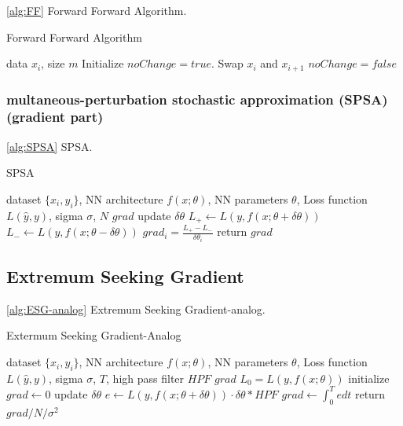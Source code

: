 \documentclass[nohyperref]{article}
\theoremstyle{plain}
\theoremstyle{definition}
\theoremstyle{remark}
\begin{document}
\cref{alg:FF} Forward Forward Algorithm.

\begin{algorithm}[tb]
   \caption{Forward Forward Algorithm}
   \label{alg:FF}
\begin{algorithmic}
    data $x_i$, size $m$
   \REPEAT
   \STATE Initialize $noChange = true$.
   \STATE Swap $x_i$ and $x_{i+1}$
   \STATE $noChange = false$
   \ENDIF
   \ENDFOR
\end{algorithmic}
\end{algorithm}

\subsubsection{multaneous-perturbation stochastic
approximation (SPSA) (gradient part)}

\cref{alg:SPSA} SPSA.

\begin{algorithm}[tb]
   \caption{SPSA}
   \label{alg:SPSA}
\begin{algorithmic}
   dataset $\{x_{i},y_{i}\}$, NN architecture $f(x;\theta)$, NN parameters $\theta$, Loss function $L(\hat{y},y)$, sigma $\sigma$, $N$
   $grad$
  \STATE update $\delta \theta$
  \STATE $L_{+} \leftarrow L(y,f(x;\theta+\delta \theta))$
  \STATE $L_{-} \leftarrow L(y,f(x;\theta-\delta \theta))$
  \STATE $grad_{i} = \frac{L_{+}-L_{-}}{\delta\theta_{i}}$
  \STATE return $grad$

\end{algorithmic}
\end{algorithm}


\subsection{Extremum Seeking Gradient}

\cref{alg:ESG-analog} Extremum Seeking Gradient-analog.

\begin{algorithm}[tb]
   \caption{Extermum Seeking Gradient-Analog}
   \label{alg:ESG-analog}
\begin{algorithmic}
   dataset $\{x_{i},y_{i}\}$, NN architecture $f(x;\theta)$, NN parameters $\theta$, Loss function $L(\hat{y},y)$, sigma $\sigma$, $T$, high pass filter $HPF$
   $grad$ 
   \STATE $L_{0} = L(y,f(x;\theta))$
   \STATE initialize $grad \leftarrow 0$
   \STATE update $\delta\theta$
   \STATE $e \leftarrow L(y,f(x;\theta+\delta \theta))\cdot\delta \theta*HPF$
   \STATE $grad \leftarrow \int_{0}^{T}e dt $ 
   \ENDFOR
   \STATE return $grad/N/\sigma^{2}$
\end{algorithmic}
\end{algorithm}
\end{document}
